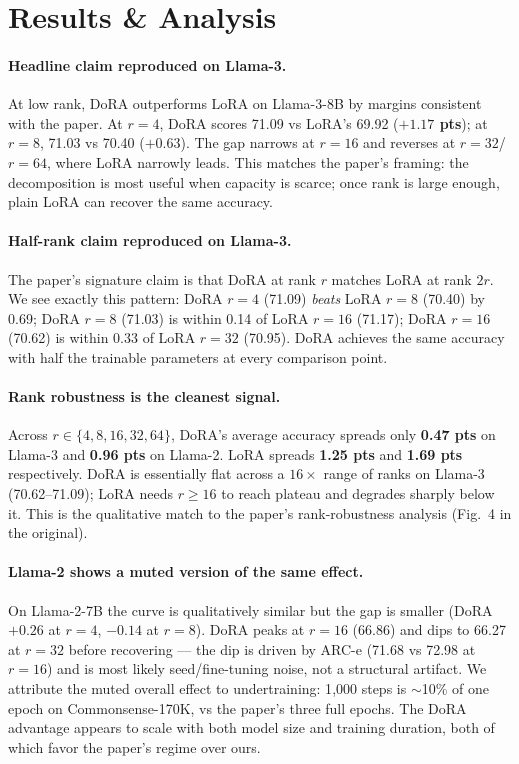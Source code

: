 \documentclass[11pt,twocolumn]{article}
\begin{document}
\section{Results \& Analysis}

\vspace{-1em}
\paragraph{Headline claim reproduced on Llama-3.}
At low rank, DoRA outperforms LoRA on Llama-3-8B by margins consistent
with the paper. At $r{=}4$, DoRA scores 71.09 vs LoRA's 69.92
(\textbf{$+1.17$ pts}); at $r{=}8$, 71.03 vs 70.40 (\textbf{$+0.63$}).
The gap narrows at $r{=}16$ and reverses at $r{=}32$/$r{=}64$, where LoRA
narrowly leads. This matches the paper's framing: the decomposition is
most useful when capacity is scarce; once rank is large enough, plain
LoRA can recover the same accuracy.
\vspace{-1em}
\paragraph{Half-rank claim reproduced on Llama-3.}
The paper's signature claim is that DoRA at rank $r$ matches LoRA at
rank $2r$. We see exactly this pattern: DoRA $r{=}4$ (71.09) \emph{beats}
LoRA $r{=}8$ (70.40) by 0.69; DoRA $r{=}8$ (71.03) is within 0.14 of
LoRA $r{=}16$ (71.17); DoRA $r{=}16$ (70.62) is within 0.33 of LoRA
$r{=}32$ (70.95). DoRA achieves the same accuracy with half the
trainable parameters at every comparison point.
\vspace{-1em}
\paragraph{Rank robustness is the cleanest signal.}
Across $r\in\{4,8,16,32,64\}$, DoRA's average accuracy spreads only
\textbf{0.47 pts} on Llama-3 and \textbf{0.96 pts} on Llama-2. LoRA
spreads \textbf{1.25 pts} and \textbf{1.69 pts} respectively. DoRA is
essentially flat across a $16{\times}$ range of ranks on Llama-3
(70.62--71.09); LoRA needs $r{\geq}16$ to reach plateau and degrades
sharply below it. This is the qualitative match to the paper's
rank-robustness analysis (Fig.~4 in the original).
\vspace{-1em}
\paragraph{Llama-2 shows a muted version of the same effect.}
On Llama-2-7B the curve is qualitatively similar but the gap is smaller
(DoRA $+0.26$ at $r{=}4$, $-0.14$ at $r{=}8$). DoRA peaks at $r{=}16$
(66.86) and dips to 66.27 at $r{=}32$ before recovering --- the dip is
driven by ARC-e (71.68 vs 72.98 at $r{=}16$) and is most likely
seed/fine-tuning noise, not a structural artifact. We attribute the
muted overall effect to undertraining: 1{,}000 steps is $\sim$10\% of
one epoch on Commonsense-170K, vs the paper's three full epochs. The
DoRA advantage appears to scale with both model size and training
duration, both of which favor the paper's regime over ours.
\vspace{-1em}
\end{document}
